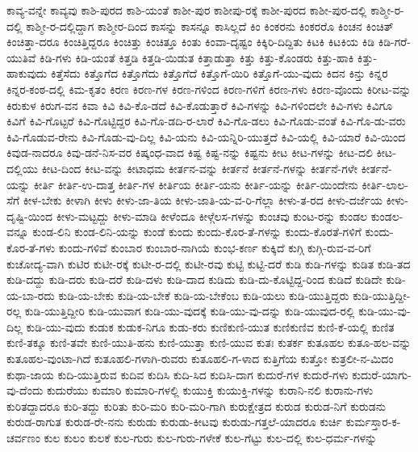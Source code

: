 {ಕಾವ್ಯ-ವನ್ನೇ
ಕಾವ್ಯವು
ಕಾಶಿ-ಪುರದ
ಕಾಶಿ-ಯಂತೆ
ಕಾಶೀ-ಪುರ
ಕಾಶೀಪು-ರಕ್ಕೆ
ಕಾಶೀ-ಪುರದ
ಕಾಶೀ-ಪುರ-ದಲ್ಲಿ
ಕಾಶ್ಮೀ-ರ-ದಲ್ಲಿ
ಕಾಶ್ಮೀ-ರ-ದಲ್ಲಿದ್ದಾಗ
ಕಾಶ್ಮೀರ-ದಿಂದ
ಕಾಸನ್ನು
ಕಾಸನ್ನೂ
ಕಾಸಿಲ್ಲದೆ
ಕಿಂ
ಕಿಂಕರನು
ಕಿಂಕರರೊ
ಕಿಂಚನ
ಕಿಂಚಿತ್
ಕಿಂಚಿತ್ತಾ-ದರೂ
ಕಿಂಚಿತ್ತಿದ್ದರೂ
ಕಿಂಚಿತ್ತು
ಕಿಂಚಿತ್ತೂ
ಕಿಂತು
ಕಿಂವಾ-ದೃಷ್ಟಂ
ಕಿಕ್ಕಿರಿ-ದಿದ್ದಿತು
ಕಿಟಕಿ
ಕಿಟಕಿಯ
ಕಿಡಿ
ಕಿಡಿ-ಗರೆ-ಯುತಿವೆ
ಕಿಡಿ-ಗಳು
ಕಿಡಿ-ಯಂತೆ
ಕಿತ್ತಡಿ
ಕಿತ್ತಡಿ-ಯಿಡುತ
ಕಿತ್ತಾಡುತ್ತಾ
ಕಿತ್ತು
ಕಿತ್ತು-ಕೊಂಡರು
ಕಿತ್ತು-ಹಾಕಿ
ಕಿತ್ತು-ಹಾಕುವುದು
ಕಿತ್ತೆಸೆದು
ಕಿತ್ತೊಗೆದ
ಕಿತ್ತೊಗೆದು
ಕಿತ್ತೊಗೆದೆ
ಕಿತ್ತೊಗೆ-ಯಿರಿ
ಕಿತ್ತೊಗೆ-ಯು-ವುದು
ಕಿದನ
ಕಿನ್ತು
ಕಿನ್ನರ
ಕಿನ್ನರ-ಕಂಠ-ದಲ್ಲಿ
ಕಿಮ-ಕೃತಂ
ಕಿರಣ
ಕಿರಣ-ಗಳ
ಕಿರಣ-ಗಳಿಂದ
ಕಿರಣ-ಗಳಿಗೆ
ಕಿರಣ-ಗಳು
ಕಿರಣ-ವೊಂದು
ಕಿರೀಟ-ವನ್ನು
ಕಿರುಕುಳ
ಕಿರುಗ-ವನ
ಕಿವಾ
ಕಿವಿ
ಕಿವಿ-ಕೊ-ಡದೆ
ಕಿವಿ-ಕೊಡುತ್ತಾರೆ
ಕಿವಿ-ಗಳನ್ನು
ಕಿವಿ-ಗಳಿಂದಲೇ
ಕಿವಿ-ಗಳು
ಕಿವಿಗೂ
ಕಿವಿಗೆ
ಕಿವಿ-ಗೊಟ್ಟರೆ
ಕಿವಿ-ಗೊಟ್ಟಿದ್ದರ
ಕಿವಿ-ಗೊ-ಡದಿ-ರ-ಲಾರೆ
ಕಿವಿ-ಗೊ-ಡಲು
ಕಿವಿ-ಗೊಡು-ವಂತೆ
ಕಿವಿ-ಗೊ-ಡು-ವರು
ಕಿವಿ-ಗೊಡುವ-ರೇನು
ಕಿವಿ-ಗೊಡು-ವು-ದಿಲ್ಲ
ಕಿವಿ-ಯನು
ಕಿವಿ-ಯನ್ನಿರಿ-ಯುತ್ತದೆ
ಕಿವಿ-ಯಲ್ಲಿ
ಕಿವಿ-ಯಾರೆ
ಕಿವಿ-ಯಿಂದ
ಕಿವುಡ-ನಾದರೂ
ಕಿವು-ಡನೆ-ನಿಸ-ವರ
ಕಿಷ್ಕಂಧ-ವಾದ
ಕಿಷ್ಟ
ಕಿಷ್ಟ-ನನ್ನು
ಕಿಷ್ಟನು
ಕೀಟ
ಕೀಟ-ಗಳನ್ನು
ಕೀಟ-ದಲಿ
ಕೀಟ-ದಲ್ಲಿಯು
ಕೀಟ-ದಿಂದ
ಕೀಟ-ವನ್ನು
ಕೀಟಾಧಮ
ಕೀರ್ತನ-ವನ್ನು
ಕೀರ್ತನೆ
ಕೀರ್ತನೆ-ಗಳನ್ನು
ಕೀರ್ತನೆ-ಗಳೇ
ಕೀರ್ತನೆ-ಯನ್ನು
ಕೀರ್ತಿ
ಕೀರ್ತಿ-ಉ-ದಾತ್ತ
ಕೀರ್ತಿ-ಗಳ
ಕೀರ್ತಿಯ
ಕೀರ್ತಿ-ಯನು
ಕೀರ್ತಿ-ಯನ್ನು
ಕೀರ್ತಿ-ಯಿಂದೇನು
ಕೀರ್ತಿ-ಲಾಲ-ಸೆಗೆ
ಕೀಳ-ಬೇಕು
ಕೀಳಾಗಿ
ಕೀಳು
ಕೀಳು-ಜಾ-ತಿಯ
ಕೀಳು-ಜಾತಿ-ಯ-ವ-ರಿ-ಗೆಲ್ಲಾ
ಕೀಳು-ತ-ರದ
ಕೀಳು-ದರ್ಜೆಯ
ಕೀಳು-ದೃಷ್ಟಿ-ಯಿಂದ
ಕೀಳು-ಮಟ್ಟದ್ದು
ಕೀಳು-ಮಾಡಿ
ಕೀಳೆಂದೂ
ಕೀಳ್ಗೆಲಸ-ಗಳನ್ನು
ಕುಂಚವು
ಕುಂಟ-ರನ್ನು
ಕುಂಡಲ
ಕುಂಡಲ-ವನ್ನೂ
ಕುಂಡ-ಲಿನಿ
ಕುಂಡ-ಲಿನಿ-ಯನ್ನು
ಕುಂಡೆ
ಕುಂದು
ಕುಂದು-ಕೊರ-ತೆ-ಗಳನ್ನು
ಕುಂದು-ಕೊರತೆ-ಗಳಿಗೆ
ಕುಂದು-ಕೊರ-ತೆ-ಗಳು
ಕುಂದು-ಗಳಿವೆ
ಕುಂಬಾರ
ಕುಂಬಾರ-ನಾಗಿಯೆ
ಕುಂಭ-ಕರ್ಣ
ಕುಕ್ಕಿದೆ
ಕುಗ್ಗಿ
ಕುಗ್ಗಿ-ರುವ-ವ-ರಿಗೆ
ಕುಚೋದ್ಯ-ವಾಗಿ
ಕುಟಿರ
ಕುಟೀ-ರಕ್ಕೆ
ಕುಟೀ-ರ-ದಲ್ಲಿ
ಕುಟೀ-ರವು
ಕುಟ್ಟಿ
ಕುಟ್ಟಿ-ದರೆ
ಕುಡಿ
ಕುಡಿ-ಗಳನ್ನು
ಕುಡಿತ
ಕುಡಿ-ತದ
ಕುಡಿ-ದದ್ದು
ಕುಡಿ-ದರು
ಕುಡಿ-ದರೆ
ಕುಡಿ-ದಳು
ಕುಡಿ-ದಾದ
ಕುಡಿದು
ಕುಡಿ-ದು-ಕೊಟ್ಟಿದ್ದ-ರಿಂದ
ಕುಡಿದೆ
ಕುಡಿದೇ
ಕುಡಿ-ಯ-ಬಾ-ರದು
ಕುಡಿ-ಯ-ಬೇಕು
ಕುಡಿ-ಯ-ಬೇಕೆ
ಕುಡಿ-ಯ-ಬೇಕೆಂಬ
ಕುಡಿ-ಯಲು
ಕುಡಿ-ಯುತ್ತಿದ್ದರು
ಕುಡಿ-ಯುತ್ತಿದ್ದೀ-ರಲ್ಲ
ಕುಡಿ-ಯುತ್ತಿದ್ದೀರಿ
ಕುಡಿ-ಯುವಾಗ
ಕುಡಿ-ಯು-ವುದಕ್ಕೆ
ಕುಡಿ-ಯು-ವು-ದನ್ನು
ಕುಡಿ-ಯುವುದ-ರಲ್ಲಿ
ಕುಡಿ-ಯು-ವು-ದಿಲ್ಲ
ಕುಡಿ-ಯು-ವುದು
ಕುಡುಕ
ಕುಡುಕ-ನಿಗೂ
ಕುಡು-ಕರು
ಕುಣಿಕುಣಿ-ಯುತ
ಕುಣಿಕುಣಿವ
ಕುಣಿ-ಕೆ-ಯಲ್ಲಿ
ಕುಣಿತ
ಕುಣಿ-ತಕ್ಕೂ
ಕುಣಿ-ತವೇ
ಕುಣಿ-ಯುತಿ-ಹನು
ಕುಣಿ-ಯುತ್ತಾ
ಕುಣಿ-ಯುವ
ಕುತಃ
ಕುತರ್ಕ
ಕುತೂಹಲ
ಕುತೂ-ಹಲ-ವನ್ನು
ಕುತೂಹಲ-ವುಂಟಾ-ಗಿದೆ
ಕುತೂಹಲಿ-ಗಳಾಗಿ-ರುವರು
ಕುತೂಹಲಿ-ಗ-ಳಾದ
ಕುತ್ತಿಗೆಯ
ಕುತ್ತೋ
ಕುತ್ರಲೀ-ನ-ಮಿದಂ
ಕುಥಾ-ಜಾಯ
ಕುದಿ-ಯುತ್ತಿರುವ
ಕುದಿವ
ಕುದಿಸಿ
ಕುದಿ-ಸಿದ
ಕುದಿಸಿ-ದಾಗ
ಕುದುರೆ-ಗಳ
ಕುದುರೆ-ಗಳು
ಕುದುರೆ-ಯಾಗು-ವು-ದೆಂದು
ಕುದುರೆಯು
ಕುಮಾರಿ
ಕುಮಾರಿ-ಗಳಲ್ಲಿ
ಕುಯುಕ್ತಿ
ಕುಯುಕ್ತಿ-ಗಳನ್ನು
ಕುರಾನಿ-ನಲಿ
ಕುರಾನು-ಗಳು
ಕುರಿತದ್ದಾದರೂ
ಕುರಿ-ತದ್ದು
ಕುರಿತು
ಕುರಿ-ಮರಿ
ಕುರಿ-ಮರಿ-ಗಾಗಿ
ಕುರುಕ್ಷೇತ್ರದ
ಕುರುಡ
ಕುರುಡ-ನಿಗೆ
ಕುರುಡನು
ಕುರುಡ-ರಾಗುತ
ಕುರುಡ-ರೇ-ನನು
ಕುರುಡು
ಕುರುಡು-ಕೀಟವು
ಕುರುಡು-ಗತ್ತಲೆ-ಯಾದರೂ
ಕುರ್ಚಿ
ಕುರ್ಮಸ್ತಾರ-ಕ-ಚರ್ವಣಂ
ಕುಲ
ಕುಲಂ
ಕುಲಕೆ
ಕುಲ-ಗುರು
ಕುಲ-ಗುರು-ಗಳೇಕೆ
ಕುಲ-ಗೆಟ್ಟು
ಕುಲ-ದಲ್ಲಿ
ಕುಲ-ಧರ್ಮ-ಗಳನ್ನು
}
